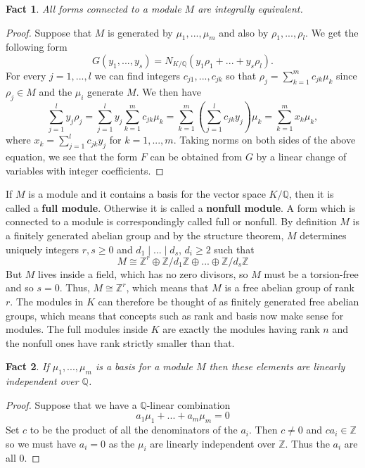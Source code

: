 \documentclass{article}
\newtheorem{fact}{Fact}[section]
\newcommand{\mbb}[1]{\mathbb{#1}}
\begin{document}
\begin{fact}\label{fact: Forms connected to module are equivalent}
    All forms connected to a module $M$ are integrally equivalent.
\end{fact}
\begin{proof}
    Suppose that $M$ is generated by $\mu_1, ..., \mu_m$ and also by $\rho_1, ...,\rho_l$. We get the following form
    $$G(y_1, ..., y_s) = N_{K/\mbb Q}(y_1 \rho_1 + ... + y_s \rho_l).$$
    For every $j = 1, ..., l$ we can find integers $c_{j1}, ..., c_{jk}$ so that
    $\rho_j = \sum_{k=1}^m c_{jk} \mu_k$ since $\rho_j \in M$ and the $\mu_i$ generate $M$. We then have
    $$\sum_{j=1}^l y_j \rho_j = \sum_{j=1}^l y_j \sum_{k=1}^m c_{jk} \mu_k = \sum_{k=1}^m (\sum_{j=1}^l c_{jk} y_j) \mu_k = \sum_{k=1}^m x_k \mu_k,$$
    where $x_k = \sum_{j=1}^l c_{jk} y_j$ for $k = 1, ..., m$. Taking norms on both sides of the above equation, we see that the form $F$ can be obtained from $G$ by a linear change of variables with integer coefficients.
\end{proof}
 If $M$ is a module and it contains a basis for the vector space $K / \mbb{Q}$, then it is called a \textbf{full module}. Otherwise it is called a \textbf{nonfull module}. A form which is connected to a module is correspondingly called full or nonfull. By definition $M$ is a finitely generated abelian group and by the structure theorem, $M$ determines uniquely integers $r,s \geq 0$ and $d_1 \mid ... \mid d_s$, $d_i \geq 2$ such that
$$M \cong \mbb{Z}^r \oplus \mbb{Z}/d_1\mbb{Z} \oplus ... \oplus \mbb{Z}/d_s\mbb{Z} $$
But $M$ lives inside a field, which has no zero divisors, so $M$ must be a torsion-free and so $s = 0$. Thus, $M \cong \mbb{Z}^r$, which means that $M$ is a free abelian group of rank $r$. The modules in $K$ can therefore be thought of as finitely generated free abelian groups, which means that concepts such as rank and basis now make sense for modules. The full modules inside $K$ are exactly the modules having rank $n$ and the nonfull ones have rank strictly smaller than that.



\begin{fact}\label{lem: Basis for module is linearly independent over Q}
    If $\mu_1, ..., \mu_m$ is a basis for a module $M$ then these elements are linearly independent over $\mbb Q$.
\end{fact}
\begin{proof}
    Suppose that we have a $\mbb Q$-linear combination 
    $$a_1 \mu_1 + ... + a_m \mu_m = 0$$
    Set $c$ to be the product of all the denominators of the $a_i$. Then $c \neq 0$ and $ca_i \in \mbb Z$ so we must have $a_i = 0$ as the $\mu_i$ are linearly independent over $\mbb Z$. Thus the $a_i$ are all 0.
\end{proof}
\end{document}
